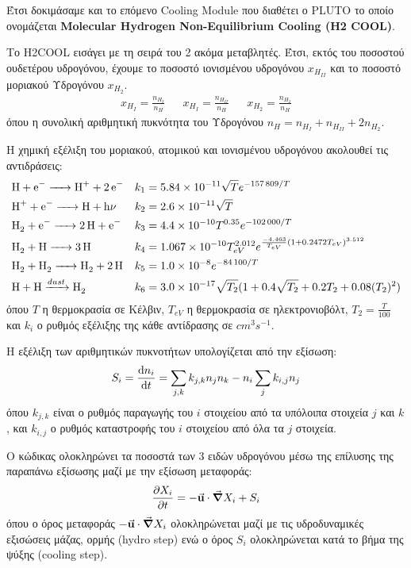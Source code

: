 \documentclass[article,a4paper,11.2pt]{memoir}
\numberwithin{equation}{subsection}
\begin{document}
	Έτσι δοκιμάσαμε και το επόμενο Cooling Module που διαθέτει ο PLUTO το οποίο ονομάζεται \textbf{Molecular Hydrogen Non-Equilibrium Cooling (H2 COOL)}.
	
	Το H2COOL εισάγει με τη σειρά του 2 ακόμα μεταβλητές. Έτσι, εκτός του ποσοστού ουδετέρου υδρογόνου, έχουμε το ποσοστό ιονισμένου υδρογόνου $x_{H_{II}}$ και το ποσοστό μοριακού Υδρογόνου $x_{H_2}$.
	\begin{align}
	x_{H_I} =\frac{n_{H_I}}{n_H} && x_{H_I} =\frac{n_{H_{II}}}{n_H} && x_{H_2} =\frac{n_{H_2}}{n_H} 
	\end{align}
	όπου η συνολική αριθμητική πυκνότητα του Υδρογόνου $n_H=n_{H_I}+n_{H_{II}}+2n_{H_2}$.
	
	Η χημική εξέλιξη του μοριακού, ατομικού και ιονισμένου υδρογόνου ακολουθεί τις αντιδράσεις:
	\begin{align}
	&\ce{H + e^- -> H^+ + 2e^-} && k_1 = \num{5.84e-11} \sqrt{T} e^{\num{-157809}/T} \\
	&\ce{H^+ + e^- -> H + h\nu} && k_2 = \num{2.6e-11} \sqrt{T}\\
	&\ce{H_2 + e^- -> 2H + e^-} && k_3 = \num{4.4e-10}T^{0.35} e^{\num{-102000}/T}\\
	&\ce{H_2 + H -> 3H} && k_4=\num{1.067e-10}T_{eV}^{2.012} e^{\frac{\num{-4.463}}{T_{eV}}(1+\num{0.2472}T_{eV})^{3.512}}\\
	&\ce{H_2 + H_2 -> H_2 + 2H} && k_5=\num{1.0e-8}e^{-\num{84100}/T} \\
	&\ce{H + H ->[dust] H_2} && k_6=\num{3.0e-17}\sqrt{T_2} (1+0.4\sqrt{T_2}+0.2 T_2 +0.08 (T_2)^2)
	\end{align}
	όπου $T$ η θερμοκρασία σε Κέλβιν, $T_{eV}$ η θερμοκρασία σε ηλεκτρονιοβόλτ, $T_2=\frac{T}{100}$ και $k_i$ ο ρυθμός εξέλιξης της κάθε αντίδρασης σε $\si{cm^3 s^{-1}}$.
	
	Η εξέλιξη των αριθμητικών πυκνοτήτων υπολογίζεται από την εξίσωση:
	\begin{equation}
	S_i=\dv{n_i}{t}=\sum\limits_{j,k}k_{j,k}n_j n_k - n_i \sum_{j}k_{i,j}n_j
	\end{equation}
	όπου $k_{j,k}$ είναι ο ρυθμός παραγωγής του $i$ στοιχείου από τα υπόλοιπα στοιχεία $j$ και $k$, και $k_{i,j}$ ο ρυθμός καταστροφής του $i$ στοιχείου από όλα τα $j$ στοιχεία.
	
	Ο κώδικας ολοκληρώνει τα ποσοστά των 3 ειδών υδρογόνου μέσω της επίλυσης της παραπάνω εξίσωσης μαζί με την εξίσωση μεταφοράς:
	\begin{equation}
	\pdv{X_i}{t}=-\va{u}\cdot \grad{X_i}+S_i
	\end{equation}
	όπου ο όρος μεταφοράς $-\va{u}\cdot \grad{X_i}$ ολοκληρώνεται μαζί με τις υδροδυναμικές εξισώσεις μάζας, ορμής (hydro step) ενώ ο όρος $S_i$ ολοκληρώνεται κατά το βήμα της ψύξης (cooling step).
	
\end{document}
